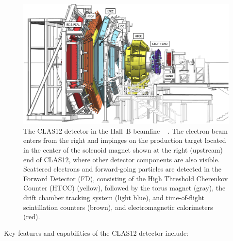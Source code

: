 \documentclass[preprint,12pt]{elsarticle}
\begin{document}
\begin{figure}[h!]
\centering
\centerline{\includegraphics[width=0.7\columnwidth]{images/CLAS12-side.png}}
\caption{The CLAS12 detector in the Hall~B beamline ~\cite{Burkert:2020akg} . The electron beam enters from the right and impinges on
  the production target located in the center of the solenoid magnet shown at the right (upstream) end of CLAS12,
  where other detector components are also visible. Scattered electrons and forward-going particles are detected
  in the Forward Detector (FD), consisting of the High Threshold Cherenkov Counter (HTCC) (yellow), 
  followed by the torus magnet (gray), the drift chamber tracking system (light blue),
  and time-of-flight scintillation counters (brown), and electromagnetic calorimeters (red). 
  } 
\label{fig:CLAS12}
\end{figure}

Key features and capabilities of the CLAS12 detector include:
\end{document}
